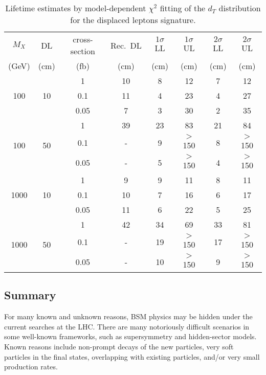 \documentclass[10pt]{article}
\begin{document}
\begin{table}
	\centering
	\begin{tabular}{|c|c|c||c||c|c||c|c|}
		\hline
		$M_X$ & DL & cross-section & Rec.\ DL & $1\sigma$ LL & $1\sigma$ UL & $2\sigma$ LL & $2\sigma$ UL \\
		(GeV) & (cm) & (fb) & (cm) & (cm) & (cm) & (cm) & (cm) \\
		\hline\hline
		\multirow{3}{*}{100} & \multirow{3}{*}{10} & 1 & 10 & 8 & 12 & 7 & 12\\
		& & 0.1 & 11 & 4 & 23 & 4 & 27\\
		& & 0.05 & 7 & 3 & 30 & 2 & 35\\    
		\hline
		\multirow{3}{*}{100} & \multirow{3}{*}{50} & 1 & 39 & 23 & 83 & 21 & 84\\
		& & 0.1 & - & 9 & $>$150 & 8 & $>$150\\
		& & 0.05 & - & 5 & $>$150 & 4 & $>$150\\
		\hline\hline
		\multirow{3}{*}{1000} & \multirow{3}{*}{10} & 1 & 9 & 9 & 11 & 8 & 11\\
		& & 0.1 & 10 & 7 & 16 & 6 & 17\\
		& & 0.05 & 11 & 6 & 22 & 5 & 25\\    
		\hline
		\multirow{3}{*}{1000} & \multirow{3}{*}{50} & 1 & 42 & 34 & 69 & 33 & 81\\
		& & 0.1 & - & 19 & $>$150 & 17 & $>$150\\
		& & 0.05 & - & 10 & $>$150 & 9 & $>$150\\    
		\hline
	\end{tabular}
	\caption{Lifetime estimates by model-dependent $\chi^2$ fitting of the $d_T$ distribution for the displaced leptons signature.}
	\label{tab:chi2_dep}
\end{table}


\subsection{Summary}
%
For many known and unknown reasons, BSM physics may be hidden under the current searches at the LHC. There are many notoriously difficult scenarios in some well-known frameworks, such as supersymmetry and hidden-sector models. Known reasons include non-prompt decays of the new particles, very soft particles in the final states, overlapping with existing particles, and/or very small production rates. 
\end{document}
